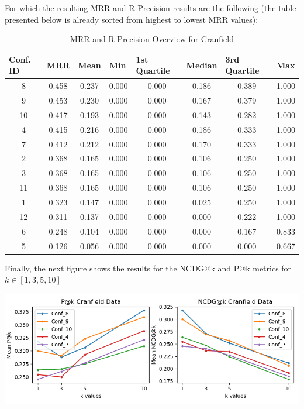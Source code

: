 \documentclass[10pt]{article}
\begin{document}
For which the resulting MRR and R-Precision results are the following (the table presented below is already sorted from highest to lowest MRR values):

\begin{table}[H]
\centering
\begin{tabular}{|c|c|c|c|c|c|c|c|}
\hline
\multicolumn{1}{|l|}{\textbf{Conf. ID}} &
  \multicolumn{1}{l|}{\textbf{MRR}} &
  \multicolumn{1}{l|}{\textbf{Mean}} &
  \multicolumn{1}{l|}{\textbf{Min}} &
  \multicolumn{1}{l|}{\textbf{1st Quartile}} &
  \multicolumn{1}{l|}{\textbf{Median}} &
  \multicolumn{1}{l|}{\textbf{3rd Quartile}} &
  \multicolumn{1}{l|}{\textbf{Max}} \\ \hline
8  & 0.458 & 0.237 & 0.000 & 0.000 & 0.186 & 0.389 & 1.000 \\ \hline
9  & 0.453 & 0.230 & 0.000 & 0.000 & 0.167 & 0.379 & 1.000 \\ \hline
10 & 0.417 & 0.193 & 0.000 & 0.000 & 0.143 & 0.282 & 1.000 \\ \hline
4  & 0.415 & 0.216 & 0.000 & 0.000 & 0.186 & 0.333 & 1.000 \\ \hline
7  & 0.412 & 0.212 & 0.000 & 0.000 & 0.170 & 0.333 & 1.000 \\ \hline
2  & 0.368 & 0.165 & 0.000 & 0.000 & 0.106 & 0.250 & 1.000 \\ \hline
3  & 0.368 & 0.165 & 0.000 & 0.000 & 0.106 & 0.250 & 1.000 \\ \hline
11 & 0.368 & 0.165 & 0.000 & 0.000 & 0.106 & 0.250 & 1.000 \\ \hline
1  & 0.323 & 0.147 & 0.000 & 0.000 & 0.025 & 0.250 & 1.000 \\ \hline
12 & 0.311 & 0.137 & 0.000 & 0.000 & 0.000 & 0.222 & 1.000 \\ \hline
6  & 0.248 & 0.104 & 0.000 & 0.000 & 0.000 & 0.167 & 0.833 \\ \hline
5  & 0.126 & 0.056 & 0.000 & 0.000 & 0.000 & 0.000 & 0.667 \\ \hline
\end{tabular}
\caption{MRR and R-Precision Overview for Cranfield}
\label{tab:my-table}
\end{table}

Finally, the next figure shows the results for the NCDG@k and P@k metrics for $k \in [1, 3, 5, 10]$

\begin{center}
\includegraphics[scale=.85]{CranPlot.png}
\end{center}
\end{document}
